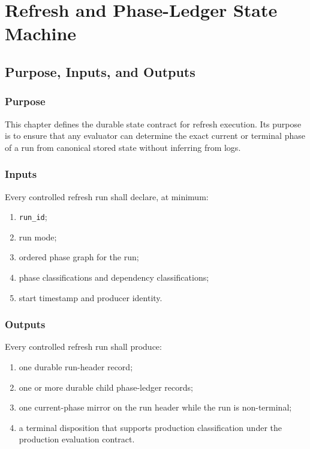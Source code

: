 \chapter{Refresh and Phase-Ledger State Machine}
\section{Purpose, Inputs, and Outputs}

\subsection{Purpose}
This chapter defines the durable state contract for refresh execution. Its purpose is to ensure that any evaluator can determine the exact current or terminal phase of a run from canonical stored state without inferring from logs.

\subsection{Inputs}
Every controlled refresh run shall declare, at minimum:
\begin{enumerate}[leftmargin=1.2cm]
    \item \texttt{run\_id};
    \item run mode;
    \item ordered phase graph for the run;
    \item phase classifications and dependency classifications;
    \item start timestamp and producer identity.
\end{enumerate}

\subsection{Outputs}
Every controlled refresh run shall produce:
\begin{enumerate}[leftmargin=1.2cm]
    \item one durable run-header record;
    \item one or more durable child phase-ledger records;
    \item one current-phase mirror on the run header while the run is non-terminal;
    \item a terminal disposition that supports production classification under the production evaluation contract.
\end{enumerate}

